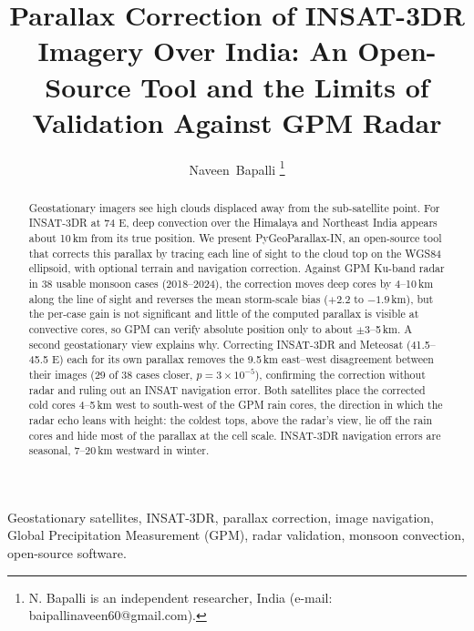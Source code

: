 \documentclass[journal]{IEEEtran}
\begin{document}
\title{Parallax Correction of INSAT-3DR Imagery Over India: An Open-Source Tool and the Limits of Validation Against GPM Radar}

\author{Naveen~Bapalli%
\thanks{N. Bapalli is an independent researcher, India (e-mail: baipallinaveen60@gmail.com).}}


\maketitle

\begin{abstract}
Geostationary imagers see high clouds displaced away from the sub-satellite point. For INSAT-3DR at 74\,\textdegree\,E, deep convection over the Himalaya and Northeast India appears about 10\,km from its true position. We present PyGeoParallax-IN, an open-source tool that corrects this parallax by tracing each line of sight to the cloud top on the WGS84 ellipsoid, with optional terrain and navigation correction. Against GPM Ku-band radar in 38 usable monsoon cases (2018--2024), the correction moves deep cores by 4--10\,km along the line of sight and reverses the mean storm-scale bias ($+2.2$ to $-1.9$\,km), but the per-case gain is not significant and little of the computed parallax is visible at convective cores, so GPM can verify absolute position only to about $\pm$3--5\,km. A second geostationary view explains why. Correcting INSAT-3DR and Meteosat (41.5--45.5\,\textdegree\,E) each for its own parallax removes the 9.5\,km east--west disagreement between their images (29 of 38 cases closer, $p=3\times10^{-5}$), confirming the correction without radar and ruling out an INSAT navigation error. Both satellites place the corrected cold cores 4--5\,km west to south-west of the GPM rain cores, the direction in which the radar echo leans with height: the coldest tops, above the radar's view, lie off the rain cores and hide most of the parallax at the cell scale. INSAT-3DR navigation errors are seasonal, 7--20\,km westward in winter.
\end{abstract}

\begin{IEEEkeywords}
Geostationary satellites, INSAT-3DR, parallax correction, image navigation, Global Precipitation Measurement (GPM), radar validation, monsoon convection, open-source software.
\end{IEEEkeywords}
\end{document}
